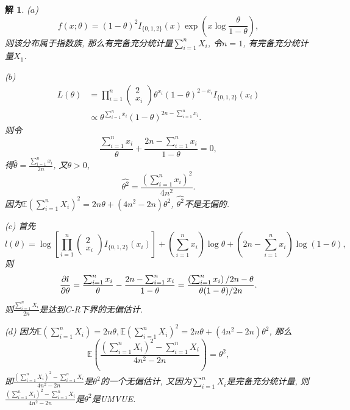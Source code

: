 \documentclass[a4paper,oneside,12pt]{ctexart}
\theoremstyle{plain}
\theoremstyle{nonumberplain}
\newtheorem{solution}{解}
\theoremstyle{nonumberplain}
\newcommand{\expect}{\mathbb{E}}
\begin{document}
    \begin{solution}
        ($a$) \begin{equation*}
            f(x;\theta)=(1-\theta)^2I_{\{0,1,2\}}(x)\exp(x\log\frac{\theta}{1-\theta}),
        \end{equation*}
        则该分布属于指数族, 那么有完备充分统计量$\sum_{i=1}^nX_i$, 令$n=1$, 有完备充分统计量$X_1$.

        ($b$) \begin{align*}
            L(\theta)&=\prod_{i=1}^n\begin{pmatrix}
                2\\
                x_i
            \end{pmatrix}\theta^{x_i}(1-\theta)^{2-x_i}I_{\{0,1,2\}}(x_i)\\
            &\propto\theta^{\sum_{i=1}^nx_i}(1-\theta)^{2n-\sum_{i=1}^nx_i}.
        \end{align*}
        则令 
        \begin{equation*}
            \frac{\sum_{i=1}^nx_i}{\theta}+\frac{2n-\sum_{i=1}^nx_i}{1-\theta}=0,
        \end{equation*}
        得$\hat{\theta}=\frac{\sum_{i=1}^nx_i}{2n}$, 又$\theta>0$, 
        \begin{equation*}
            \widehat{\theta^2}=\frac{\left(\sum_{i=1}^nx_i\right)^2}{4n^2}.
        \end{equation*}
        因为$\expect\left(\sum_{i=1}^nX_i\right)^2=2n\theta+(4n^2-2n)\theta^2$, $\widehat{\theta^2}$不是无偏的.

        ($c$) 首先
        \begin{equation*}
            l(\theta)=\log\left[\prod_{i=1}^n\begin{pmatrix}
                2\\
                x_i
            \end{pmatrix}I_{\{0,1,2\}}(x_i)\right]+\left(\sum_{i=1}^nx_i\right)\log\theta+(2n-\sum_{i=1}^nx_i)\log(1-\theta),
        \end{equation*}
        则 
        \begin{equation*}
            \pdv{l}{\theta}=\frac{\sum_{i=1}^nx_i}{\theta}-\frac{2n-\sum_{i=1}^nx_i}{1-\theta}=\frac{\left(\sum_{i=1}^nx_i\right)/2n-\theta}{\theta(1-\theta)/2n}.
        \end{equation*}
        则$\frac{\sum_{i=1}^nX_i}{2n}$是达到C-R下界的无偏估计.

        ($d$) 因为$\expect\left(\sum_{i=1}^nX_i\right)=2n\theta,\expect\left(\sum_{i=1}^nX_i\right)^2=2n\theta+(4n^2-2n)\theta^2$, 那么 
        \begin{equation*}
            \expect\left(\frac{\left(\sum_{i=1}^nX_i\right)^2-\sum_{i=1}^nX_i}{4n^2-2n}\right)=\theta^2,
        \end{equation*}
        即$\frac{\left(\sum_{i=1}^nX_i\right)^2-\sum_{i=1}^nX_i}{4n^2-2n}$是$\theta^2$的一个无偏估计, 又因为$\sum_{i=1}^nX_i$是完备充分统计量, 
        则$\frac{\left(\sum_{i=1}^nX_i\right)^2-\sum_{i=1}^nX_i}{4n^2-2n}$是$\theta^2$是UMVUE.


\end{solution}
\end{document}
